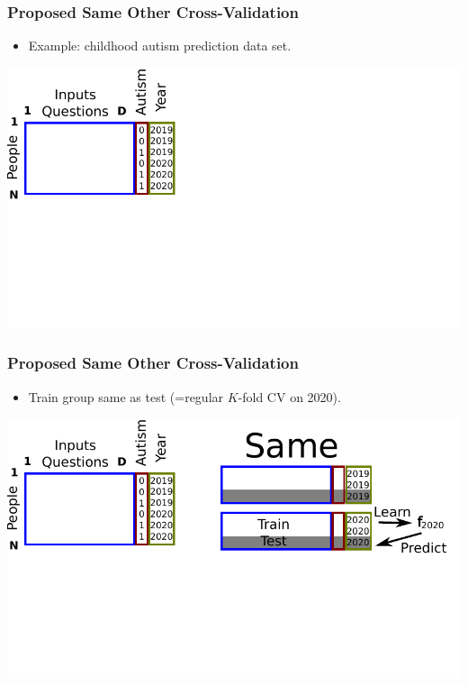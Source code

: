 \documentclass{beamer}
\begin{document}
\begin{frame}
  \frametitle{Proposed Same Other Cross-Validation}
  \begin{itemize}
  \item Example: childhood autism prediction data set.
  \end{itemize}
  \includegraphics[width=\textwidth]{drawing-cv-same-other-years-1.pdf}
\end{frame}

\begin{frame}
  \frametitle{Proposed Same Other Cross-Validation}
  \begin{itemize}
  \item Train group same as test (=regular $K$-fold CV on 2020).
  \end{itemize}
  \includegraphics[width=\textwidth]{drawing-cv-same-other-years-2.pdf}
\end{frame}
\end{document}
